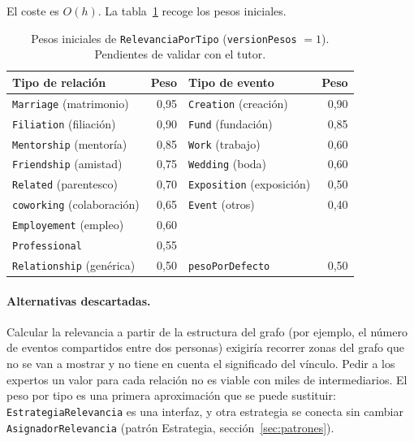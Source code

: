 El coste es $O(h)$. La tabla~\ref{tab:pesos} recoge los pesos iniciales.

\begin{table}[htbp]
  \centering
  \caption{Pesos iniciales de \texttt{RelevanciaPorTipo} (\texttt{versionPesos} $=1$). Pendientes de validar con el tutor.}
  \label{tab:pesos}
  \begin{tabular}{@{}lr@{\hspace{2.5em}}lr@{}}
    \toprule
    Tipo de relación & Peso & Tipo de evento & Peso \\
    \midrule
    \texttt{Marriage} (matrimonio) & 0,95 & \texttt{Creation} (creación) & 0,90 \\
    \texttt{Filiation} (filiación) & 0,90 & \texttt{Fund} (fundación) & 0,85 \\
    \texttt{Mentorship} (mentoría) & 0,85 & \texttt{Work} (trabajo) & 0,60 \\
    \texttt{Friendship} (amistad) & 0,75 & \texttt{Wedding} (boda) & 0,60 \\
    \texttt{Related} (parentesco) & 0,70 & \texttt{Exposition} (exposición) & 0,50 \\
    \texttt{coworking} (colaboración) & 0,65 & \texttt{Event} (otros) & 0,40 \\
    \texttt{Employement} (empleo) & 0,60 & & \\
    \texttt{Professional} & 0,55 & & \\
    \texttt{Relationship} (genérica) & 0,50 & \texttt{pesoPorDefecto} & 0,50 \\
    \bottomrule
  \end{tabular}
\end{table}


\paragraph{Alternativas descartadas.} Calcular la relevancia a partir de la estructura del grafo (por ejemplo, el número de eventos compartidos entre dos personas) exigiría recorrer zonas del grafo que no se van a mostrar y no tiene en cuenta el significado del vínculo. Pedir a los expertos un valor para cada relación no es viable con miles de intermediarios. El peso por tipo es una primera aproximación que se puede sustituir: \texttt{EstrategiaRelevancia} es una interfaz, y otra estrategia se conecta sin cambiar \texttt{AsignadorRelevancia} (patrón Estrategia, sección~\ref{sec:patrones}).


